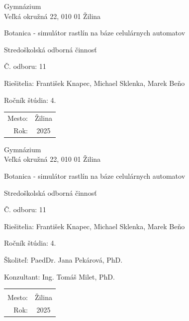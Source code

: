 \documentclass[12pt]{article}
\def\nazovprace{Botanica - simulátor rastlín na báze celulárnych automatov}
\def\autori{František Knapec, Michael Sklenka, Marek Beňo}
\begin{document}
\begin{titlepage}
	\setlength{\parindent}{0pt}

	\begin{center}
		Gymnázium \\
		Veľká okružná 22, 010 01 Žilina

		\vspace{7cm}
		\Huge \nazovprace

		\vspace{1.13cm}
		\Large Stredoškolská odborná činnosť

		\vspace{2.12cm}
		\normalsize Č. odboru: 11
	\end{center}

	\vfill

	\begin{minipage}{0.75\textwidth}
		Riešitelia: \autori \par
		Ročník štúdia: 4.
	\end{minipage}
	\hfill
	\begin{minipage}{0.23\textwidth}
		\hfil %
		\begin{tabular}{rc}
			Mesto: & Žilina \\
			Rok:   & 2025
		\end{tabular}
	\end{minipage}
\end{titlepage}

\begin{titlepage}
	\setlength{\parindent}{0pt}

	\begin{center}
		Gymnázium \\
		Veľká okružná 22, 010 01 Žilina

		\vspace{7cm}
		\Huge \nazovprace

		\vspace{1.13cm}
		\Large Stredoškolská odborná činnosť

		\vspace{2.12cm}
		\normalsize Č. odboru: 11
	\end{center}

	\vfill

	\begin{minipage}{0.75\textwidth}
		Riešitelia: \autori \par
		Ročník štúdia: 4. \par
		Školiteľ: PaedDr. Jana Pekárová, PhD.\par
		Konzultant: Ing. Tomáš Milet, PhD.
	\end{minipage}
	\hfill
	\begin{minipage}{0.23\textwidth}
		\hfil %
		\begin{tabular}{rc}
			\\ \\
			Mesto: & Žilina \\
			Rok:   & 2025
		\end{tabular}
	\end{minipage}
\end{titlepage}
\end{document}
